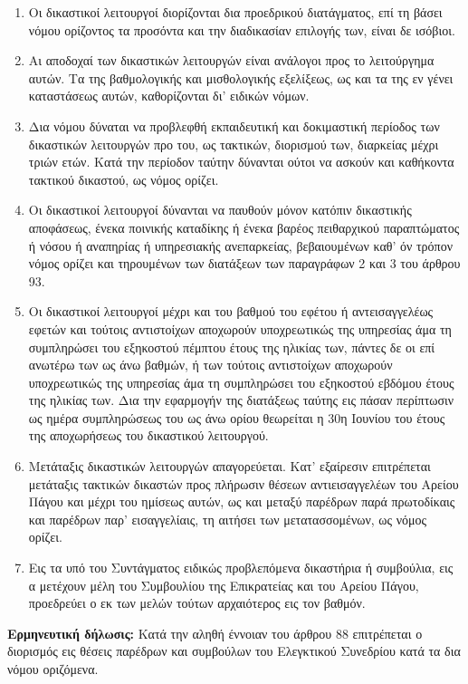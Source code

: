 \documentclass[twoside, a4paper, 10pt]{article}
\begin{document}
\begin{multicols}{2}
\begin{enumerate}
\begin{BigQuote}
\begin{enumerate}
  \item[1.] Οι δικαστικοί λειτουργοί διορίζονται δια προεδρικού διατάγματος, επί τη βάσει νόμου ορίζοντος τα προσόντα και την διαδικασίαν επιλογής των, είναι δε ισόβιοι.
  \item[2.] Αι αποδοχαί των δικαστικών λειτουργών είναι ανάλογοι προς το λειτούργημα αυτών. Τα της βαθμολογικής και μισθολογικής εξελίξεως, ως και τα της εν γένει καταστάσεως αυτών, καθορίζονται δι' ειδικών νόμων.
  \item[3.] Δια νόμου δύναται να προβλεφθή εκπαιδευτική και δοκιμαστική περίοδος των δικαστικών λειτουργών προ του, ως τακτικών, διορισμού των, διαρκείας μέχρι τριών ετών. Κατά την περίοδον ταύτην δύνανται ούτοι να ασκούν και καθήκοντα τακτικού δικαστού, ως νόμος ορίζει.
  \item[4.] Οι δικαστικοί λειτουργοί δύνανται να παυθούν μόνον κατόπιν δικαστικής αποφάσεως, ένεκα ποινικής καταδίκης ή ένεκα βαρέος πειθαρχικού παραπτώματος ή νόσου ή αναπηρίας ή υπηρεσιακής ανεπαρκείας, βεβαιουμένων καθ' όν τρόπον νόμος ορίζει και τηρουμένων των διατάξεων των παραγράφων 2 και 3 του άρθρου 93.
  \item[5.] Οι δικαστικοί λειτουργοί μέχρι και του βαθμού του εφέτου ή αντεισαγγελέως εφετών και τούτοις αντιστοίχων αποχωρούν υποχρεωτικώς της υπηρεσίας άμα τη συμπληρώσει του εξηκοστού πέμπτου έτους της ηλικίας των, πάντες δε οι επί ανωτέρω των ως άνω βαθμών, ή των τούτοις αντιστοίχων αποχωρούν υποχρεωτικώς της υπηρεσίας άμα τη συμπληρώσει του εξηκοστού εβδόμου έτους της ηλικίας των. Δια την εφαρμογήν της διατάξεως ταύτης εις πάσαν περίπτωσιν ως ημέρα συμπληρώσεως του ως άνω ορίου θεωρείται η 30η Ιουνίου του έτους της αποχωρήσεως του δικαστικού λειτουργού.
  \item[6.] Μετάταξις δικαστικών λειτουργών απαγορεύεται. Κατ' εξαίρεσιν επιτρέπεται μετάταξις τακτικών δικαστών προς πλήρωσιν θέσεων αντιεισαγγελέων του Αρείου Πάγου και μέχρι του ημίσεως αυτών, ως και μεταξύ παρέδρων παρά πρωτοδίκαις και παρέδρων παρ' εισαγγελίαις, τη αιτήσει των μετατασσομένων, ως νόμος ορίζει.
  \item[7.] Εις τα υπό του Συντάγματος ειδικώς προβλεπόμενα δικαστήρια ή συμβούλια, εις α μετέχουν μέλη του Συμβουλίου της Επικρατείας και του Αρείου Πάγου, προεδρεύει ο εκ των μελών τούτων αρχαιότερος εις τον βαθμόν.
\end{enumerate}

\textbf{Ερμηνευτική δήλωσις:}
Κατά την αληθή έννοιαν του άρθρου 88 επιτρέπεται ο διορισμός εις θέσεις παρέδρων και συμβούλων του Ελεγκτικού Συνεδρίου κατά τα δια νόμου οριζόμενα.



\end{BigQuote}
\end{enumerate}
\end{multicols}
\end{document}
